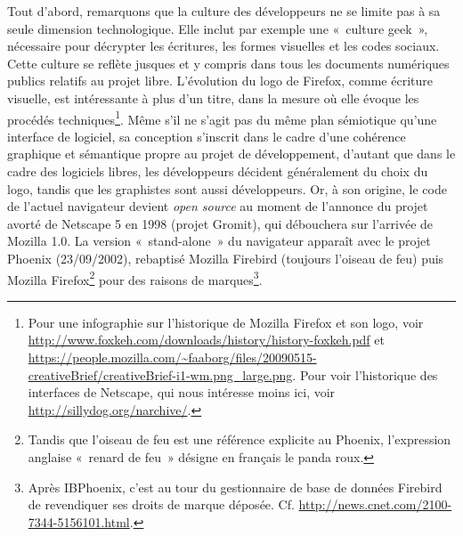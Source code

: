 \documentclass{FramateX}
\begin{document}
\begin{refsection}
Tout d'abord, remarquons que la culture des développeurs ne se limite
pas à sa seule dimension technologique. Elle inclut par exemple une
«~culture geek~», nécessaire pour décrypter les écritures, les formes
visuelles et les codes sociaux. Cette culture se reflète jusques et y
compris dans tous les documents numériques publics relatifs au projet
libre. L'évolution du logo de Firefox, comme écriture visuelle, est
intéressante à plus d'un titre, dans la mesure où elle évoque les
procédés techniques\footnote{Pour une infographie
sur l'historique de Mozilla Firefox et son logo, voir
\url{http://www.foxkeh.com/downloads/history/history-foxkeh.pdf} et
\url{https://people.mozilla.com/~faaborg/files/20090515-creativeBrief/creativeBrief-i1-wm.png_large.png}. Pour voir l'historique des interfaces de Netscape, qui nous
intéresse moins ici, voir \url{http://sillydog.org/narchive/}.}. Même
s'il ne s'agit pas du même plan sémiotique qu'une interface de
logiciel, sa conception s'inscrit dans le cadre d'une cohérence
graphique et sémantique propre au projet de développement, d'autant que
dans le cadre des logiciels libres, les développeurs décident
généralement du choix du logo, tandis que les graphistes sont aussi
développeurs. Or, à son origine, le code de l'actuel navigateur devient
\textit{open source} au moment de l'annonce du projet avorté de Netscape
5 en 1998 (projet Gromit), qui débouchera sur l'arrivée de Mozilla 1.0.
La version «~stand-alone~» du navigateur apparaît avec le projet
Phoenix (23/09/2002), rebaptisé Mozilla Firebird (toujours l'oiseau de
feu) puis Mozilla Firefox\footnote{Tandis que
l'oiseau de feu est une référence explicite au Phoenix, l'expression
anglaise «~renard de feu~» désigne en français le panda roux.} pour
des raisons de marques\footnote{Après IBPhoenix,
c'est au tour du gestionnaire de base de données Firebird de
revendiquer ses droits de marque déposée. Cf.
\url{http://news.cnet.com/2100-7344-5156101.html}.}. 


\end{refsection}
\end{document}
